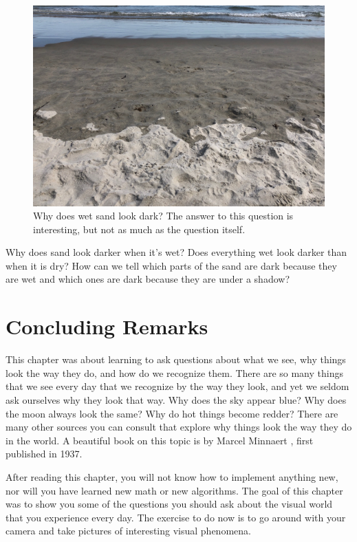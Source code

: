 \begin{figure}[t]
\centerline{
    \includegraphics[width=.8\linewidth]{figures/visionscience/wet_sand_2.jpeg}}
    \caption{Why does wet sand look dark? The answer to this question is interesting, but not as much as the question itself.}
    \label{fig:wet_sand}
\end{figure}


Why does sand look darker when it's wet? Does everything wet look darker than when it is dry? How can we tell which parts of the sand are dark because they are wet and which ones are dark because they are under a shadow? 


\section{Concluding Remarks}

This chapter was about learning to ask questions about what we see, why things look the way they do, and how do we recognize them. There are so many things that we see every day that we recognize by the way they look, and yet we seldom ask ourselves why they look that way. Why does the sky appear blue? Why does the moon always look the same? Why do hot things become redder? 
There are many other sources you can consult that explore why things look the way they do in the world. A beautiful book on this topic is  by Marcel Minnaert \cite{Minnaert1993}, first published in 1937. 

After reading this chapter, you will not know how to implement anything new, nor will you have learned new math or new algorithms. The goal of this chapter was to show you some of the questions you should ask about the visual world that you experience every day. The exercise to do now is to go around with your camera and take pictures of interesting visual phenomena.

